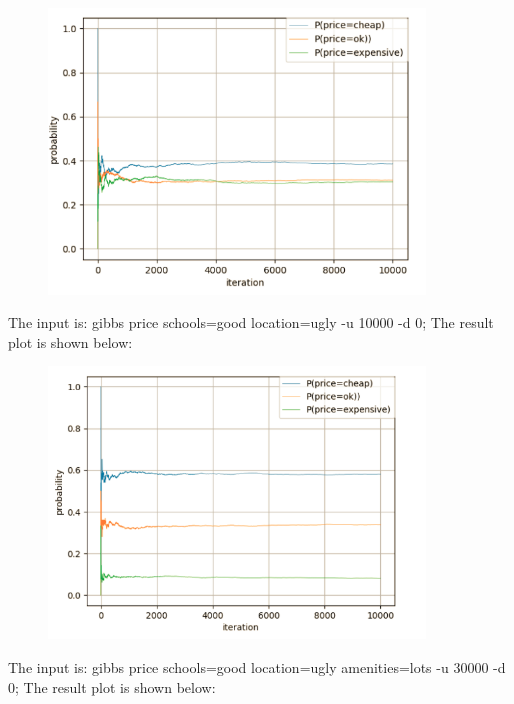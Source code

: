 \documentclass[11pt, a4paper]{article}
\begin{document}
\begin{figure}[htbp]
	
	\centering 
	\includegraphics[width=10cm]{gs_11}
	
	\label{fig:gb11}
	
\end{figure}

The input is: gibbs price schools=good location=ugly -u 10000 -d 0; The result plot is shown below: 

\begin{figure}[htbp]
	
	\centering 
	\includegraphics[width=10cm]{gs_12}
	
	\label{fig:gb12}
	
\end{figure}

The input is: gibbs price schools=good location=ugly amenities=lots -u 30000 -d 0; The result plot is shown below: 
\end{document}
